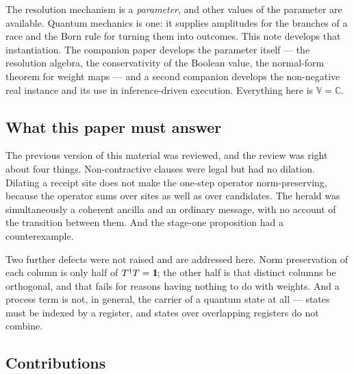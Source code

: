\documentclass[11pt,a4paper]{article}
\newcommand{\Id}{\mathrm{1}\hspace{-0.30em}\mathrm{l}}
\theoremstyle{plain}
\theoremstyle{definition}
\theoremstyle{remark}
\newcommand{\V}{\mathbb{V}}
\newcommand{\Cx}{\mathbb{C}}
\begin{document}
The resolution mechanism is a \emph{parameter}, and other values of the
parameter are available. Quantum mechanics is one: it supplies amplitudes for
the branches of a race and the Born rule for turning them into outcomes. This
note develops that instantiation. The companion paper \cite{ResAlg} develops the
parameter itself --- the resolution algebra, the conservativity of the Boolean
value, the normal-form theorem for weight maps --- and a second companion
\cite{PLNPaper} develops the non-negative real instance and its use in
inference-driven execution. Everything here is $\V = \Cx$.

\subsection{What this paper must answer}

The previous version of this material \cite{GWv4} was reviewed, and the review
was right about four things. Non-contractive clauses were legal but had no
dilation. Dilating a receipt site does not make the one-step operator
norm-preserving, because the operator sums over sites as well as over
candidates. The herald was simultaneously a coherent ancilla and an ordinary
message, with no account of the transition between them. And the stage-one
proposition had a counterexample.

Two further defects were not raised and are addressed here. Norm preservation of
each column is only half of $T^{\dagger}T = \Id$; the other half is that
distinct columns be orthogonal, and that fails for reasons having nothing to do
with weights. And a process term is not, in general, the carrier of a quantum
state at all --- states must be indexed by a register, and states over
overlapping registers do not combine.

\subsection{Contributions}
\end{document}
